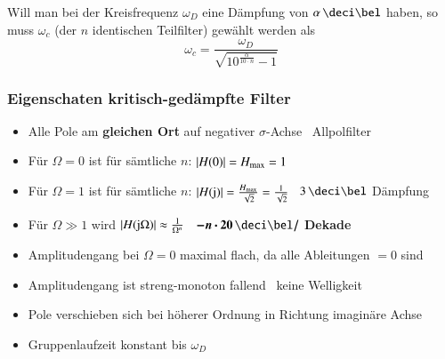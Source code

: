 \vspace{0.2cm}
Will man bei der Kreisfrequenz $\omega_D$ eine Dämpfung von $\alpha \, \deci \bel$ haben, so muss $\omega_c$ (der $n$ identischen
Teilfilter) gewählt werden als
$$ \boxed{ \omega_c = \frac{\omega_D}{\sqrt{10^{\frac{\alpha}{10 \cdot n}} -1}} } $$ 


\subsubsection{Eigenschaten kritisch-gedämpfte Filter}

\begin{itemize}
    \item Alle Pole am \textbf{gleichen Ort} auf negativer $\sigma$-Achse \textrightarrow\ Allpolfilter
    \item Für $\Omega = 0$ ist für sämtliche $n$: $|H(0)| = H_{\rm max} = 1$
    \item Für $\Omega = 1$ ist für sämtliche $n$: $|H(\mathrm{j})| = \frac{H_{\rm max}}{\sqrt{2}} = \frac{1}{\sqrt{2}}$
        \textrightarrow\ $3 \, \deci \bel$ Dämpfung
    \item Für $\Omega \gg 1$ wird $|H(\mathrm{j} \Omega)| \approx \frac{1}{\Omega^n}$ \textrightarrow\ $\bm{- n \cdot 20 \, \deci \bel /}$ \textbf{Dekade}
    \item Amplitudengang bei $\Omega = 0$ maximal flach, da alle Ableitungen $=0$ sind
    \item Amplitudengang ist streng-monoton fallend \textrightarrow\ keine Welligkeit
    \item Pole verschieben sich bei höherer Ordnung in Richtung imaginäre Achse
    \item Gruppenlaufzeit konstant bis $\omega_D$
\end{itemize}


